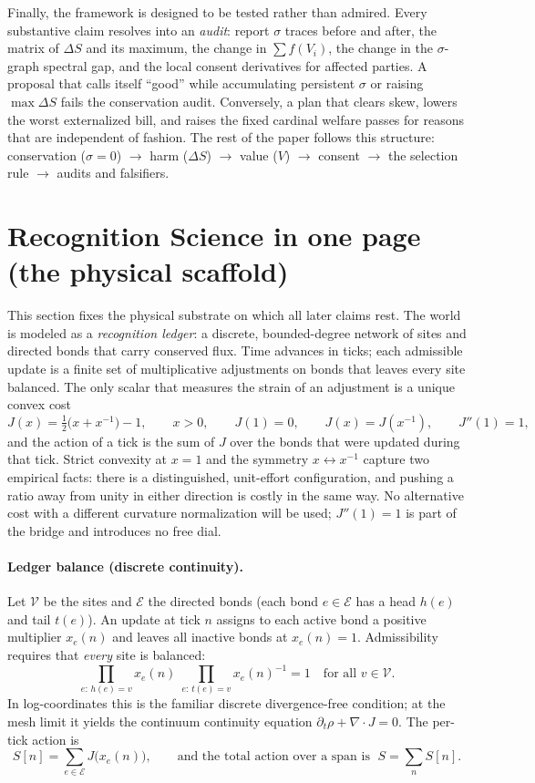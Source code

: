 \documentclass[11pt]{article}
\begin{document}
Finally, the framework is designed to be tested rather than admired. Every substantive claim resolves into an \emph{audit}: report \(\sigma\) traces before and after, the matrix of \(\Delta S\) and its maximum, the change in \(\sum f(V_i)\), the change in the \(\sigma\)-graph spectral gap, and the local consent derivatives for affected parties. A proposal that calls itself “good” while accumulating persistent \(\sigma\) or raising \(\max\Delta S\) fails the conservation audit. Conversely, a plan that clears skew, lowers the worst externalized bill, and raises the fixed cardinal welfare passes for reasons that are independent of fashion. The rest of the paper follows this structure: conservation (\(\sigma=0\)) \(\rightarrow\) harm (\(\Delta S\)) \(\rightarrow\) value (\(V\)) \(\rightarrow\) consent \(\rightarrow\) the selection rule \(\rightarrow\) audits and falsifiers.

\section{Recognition Science in one page (the physical scaffold)}

This section fixes the physical substrate on which all later claims rest. The world is modeled as a \emph{recognition ledger}: a discrete, bounded-degree network of sites and directed bonds that carry conserved flux. Time advances in ticks; each admissible update is a finite set of multiplicative adjustments on bonds that leaves every site balanced. The only scalar that measures the strain of an adjustment is a unique convex cost
\[
J(x)=\tfrac12\big(x+x^{-1}\big)-1,\qquad x>0,\qquad J(1)=0,\qquad J(x)=J(x^{-1}),\qquad J''(1)=1,
\]
and the action of a tick is the sum of $J$ over the bonds that were updated during that tick. Strict convexity at $x=1$ and the symmetry $x\leftrightarrow x^{-1}$ capture two empirical facts: there is a distinguished, unit-effort configuration, and pushing a ratio away from unity in either direction is costly in the same way. No alternative cost with a different curvature normalization will be used; $J''(1)=1$ is part of the bridge and introduces no free dial.

\paragraph{Ledger balance (discrete continuity).}
Let $\mathcal{V}$ be the sites and $\mathcal{E}$ the directed bonds (each bond $e\in\mathcal{E}$ has a head $h(e)$ and tail $t(e)$). An update at tick $n$ assigns to each active bond a positive multiplier $x_e(n)$ and leaves all inactive bonds at $x_e(n)=1$. Admissibility requires that \emph{every} site is balanced:
\[
\prod_{e:\,h(e)=v} x_e(n)\;\prod_{e:\,t(e)=v} x_e(n)^{-1}=1\quad \text{for all }v\in\mathcal{V}.
\]
In log-coordinates this is the familiar discrete divergence-free condition; at the mesh limit it yields the continuum continuity equation $\partial_t\rho+\nabla\!\cdot J=0$. The per-tick action is
\[
S[n]=\sum_{e\in\mathcal{E}} J\big(x_e(n)\big),\qquad \text{and the total action over a span is }\; S=\sum_{n} S[n].
\]
\end{document}
